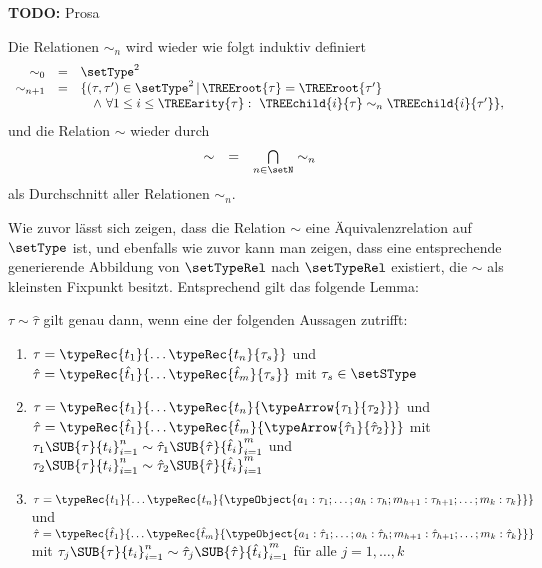 {\bf TODO:} Prosa

\begin{definition} \label{definition:Lct:Typgleichheit}
  Die Relationen $\sim_n$ wird wieder wie folgt induktiv definiert
  \[\begin{array}{rcl}
    \sim_0     & = & \setType^2 \\
    \sim_{n+1} & = & \{(\tau,\tau')\in\setType^2\,|\,\TREEroot{\tau} = \TREEroot{\tau'} \\
               &   & \quad \wedge \ \forall 1 \le i \le \TREEarity{\tau}:\ \TREEchild{i}{\tau} \sim_n \TREEchild{i}{\tau'}\},
  \end{array}\]
  und die Relation $\sim$ wieder durch
  \[\begin{array}{rcl}
    \sim & = & \bigcap\limits_{n\in\setN} \sim_n
  \end{array}\]
  als Durchschnitt aller Relationen $\sim_n$.
\end{definition}

Wie zuvor l\"asst sich zeigen, dass die Relation $\sim$ eine \"Aquivalenzrelation auf $\setType$ ist, und ebenfalls
wie zuvor kann man zeigen, dass eine entsprechende generierende Abbildung von $\setTypeRel$ nach $\setTypeRel$
existiert, die $\sim$ als kleinsten Fixpunkt besitzt. Entsprechend gilt das folgende Lemma:

\begin{lemma} \label{lemma:Lct:Aequivalenz_Lemma}
  $\tau\sim\hat{\tau}$ gilt genau dann, wenn eine der folgenden Aussagen zutrifft:
  \begin{enumerate}
    \item $\tau = \typeRec{t_1}{\ldots\typeRec{t_n}{\tau_s}}$ und
          $\hat{\tau} = \typeRec{\hat{t}_1}{\ldots\typeRec{\hat{t}_m}{\tau_s}}$ mit $\tau_s\in\setSType$

    \item $\tau = \typeRec{t_1}{\ldots\typeRec{t_n}{\typeArrow{\tau_1}{\tau_2}}}$
          und $\hat{\tau} = \typeRec{\hat{t}_1}{\ldots\typeRec{\hat{t}_m}{\typeArrow{\hat{\tau}_1}{\hat{\tau}_2}}}$ mit \\
          $\tau_1{\SUB{\tau}{t_i}}_{i=1}^{n} \sim \hat{\tau}_1{\SUB{\hat{\tau}}{\hat{t}_i}}_{i=1}^{m}$
          und $\tau_2{\SUB{\tau}{t_i}}_{i=1}^{n} \sim \hat{\tau}_2{\SUB{\hat{\tau}}{\hat{t}_i}}_{i=1}^{m}$

    \item $\tau = \typeRec{t_1}{\ldots\typeRec{t_n}{\typeObject{a_1:\tau_1;\ldots;a_h:\tau_h;m_{h+1}:\tau_{h+1};\ldots;m_k:\tau_k}}}$ und \\
          $\hat{\tau} = \typeRec{\hat{t}_1}{\ldots\typeRec{\hat{t}_m}{\typeObject{a_1:\hat{\tau}_1;\ldots;a_h:\hat{\tau}_h;m_{h+1}:\hat{\tau}_{h+1};\ldots;m_k:\hat{\tau}_k}}}$ \\
          mit $\tau_j{\SUB{\tau}{t_i}}_{i=1}^{n} \sim \hat{\tau}_j{\SUB{\hat{\tau}}{\hat{t}_i}}_{i=1}^{m}$ f\"ur alle $j=1,\ldots,k$
  \end{enumerate}
\end{lemma}

